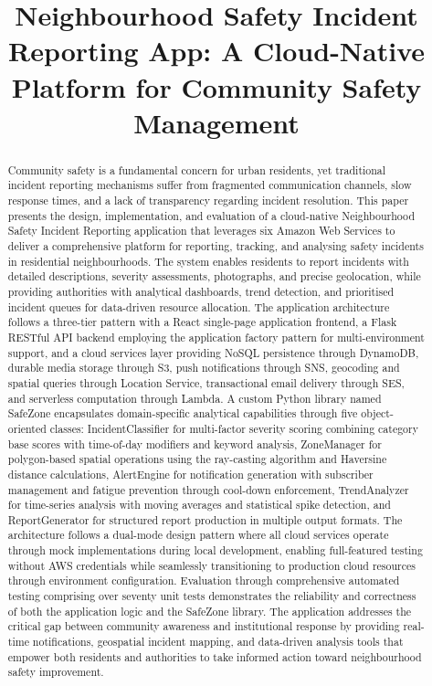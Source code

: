 \documentclass[conference]{IEEEtran}
\title{Neighbourhood Safety Incident Reporting App: A Cloud-Native Platform for Community Safety Management}
\author{\IEEEauthorblockN{Adithya Reddy Madireddy}
\IEEEauthorblockA{National College of Ireland\\
Dublin, Ireland\\
adithya.madireddy@student.ncirl.ie}}
\begin{document}
\maketitle

\begin{abstract}
Community safety is a fundamental concern for urban residents, yet traditional incident reporting mechanisms suffer from fragmented communication channels, slow response times, and a lack of transparency regarding incident resolution. This paper presents the design, implementation, and evaluation of a cloud-native Neighbourhood Safety Incident Reporting application that leverages six Amazon Web Services to deliver a comprehensive platform for reporting, tracking, and analysing safety incidents in residential neighbourhoods. The system enables residents to report incidents with detailed descriptions, severity assessments, photographs, and precise geolocation, while providing authorities with analytical dashboards, trend detection, and prioritised incident queues for data-driven resource allocation. The application architecture follows a three-tier pattern with a React single-page application frontend, a Flask RESTful API backend employing the application factory pattern for multi-environment support, and a cloud services layer providing NoSQL persistence through DynamoDB, durable media storage through S3, push notifications through SNS, geocoding and spatial queries through Location Service, transactional email delivery through SES, and serverless computation through Lambda. A custom Python library named SafeZone encapsulates domain-specific analytical capabilities through five object-oriented classes: IncidentClassifier for multi-factor severity scoring combining category base scores with time-of-day modifiers and keyword analysis, ZoneManager for polygon-based spatial operations using the ray-casting algorithm and Haversine distance calculations, AlertEngine for notification generation with subscriber management and fatigue prevention through cool-down enforcement, TrendAnalyzer for time-series analysis with moving averages and statistical spike detection, and ReportGenerator for structured report production in multiple output formats. The architecture follows a dual-mode design pattern where all cloud services operate through mock implementations during local development, enabling full-featured testing without AWS credentials while seamlessly transitioning to production cloud resources through environment configuration. Evaluation through comprehensive automated testing comprising over seventy unit tests demonstrates the reliability and correctness of both the application logic and the SafeZone library. The application addresses the critical gap between community awareness and institutional response by providing real-time notifications, geospatial incident mapping, and data-driven analysis tools that empower both residents and authorities to take informed action toward neighbourhood safety improvement.
\end{abstract}
\end{document}
